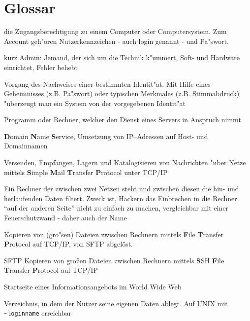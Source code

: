 \section{Glossar}
\begin{description}
  \item[Account] die Zugangsberechtigung zu einem Computer oder
    Computersystem. Zum Account geh"oren Nutzerkennzeichen - auch login genannt
    - und Pa"swort.
  \item[Administrator] kurz Admin: Jemand, der sich um die Technik k"ummert,
    Soft- und Hardware einrichtet, Fehler behebt
  \item[Authentifizierung] Vorgang des Nachweises einer bestimmten
    Identit"at. Mit Hilfe eines Geheimnisses (z.B. Pa"swort) oder typischen
    Merkmales (z.B. Stimmabdruck) "uberzeugt man ein System von der
    vorgegebenen Identit"at
  \item[Client] Programm oder Rechner, welcher den Dienst eines Servers in
    Anspruch nimmt
  \item[DNS] \textbf{D}omain \textbf{N}ame \textbf{S}ervice, Umsetzung von
    IP--Adressen auf Host- und Domainnamen
  \item[E-Mail] Versenden, Empfangen, Lagern und Katalogisieren von
    Nachrichten "uber Netze mittels \textbf{S}imple \textbf{M}ail
    \textbf{T}ransfer \textbf{P}rotocol unter TCP/IP 
  \item[Firewall] Ein Rechner der zwischen zwei Netzen steht und zwischen
    diesen die hin- und herlaufenden Daten filtert. Zweck ist, Hackern das
    Einbrechen in die Rechner "`auf der anderen Seite"' nicht zu einfach zu
    machen, vergleichbar mit einer Feuerschutzwand - daher auch der Name
  \item[FTP] Kopieren von (gro"sen) Dateien zwischen Rechnern mittels 
      \textbf{F}ile \textbf{T}ransfer \textbf{P}rotocol auf TCP/IP,
      von SFTP abgelöst.
  \item{SFTP} Kopieren von großen Dateien zwischen Rechnern mittels
    \textbf{S}SH \textbf{F}ile  \textbf{T}ransfer \textbf{P}rotocol
    auf TCP/IP
  \item[Homepage] Startseite eines Informationsangebots im World Wide Web
  \item[Homeverzeichnis] Verzeichnis, in dem der Nutzer seine eigenen Daten
    ablegt. Auf UNIX mit \verb#~loginname# erreichbar

\end{description}
